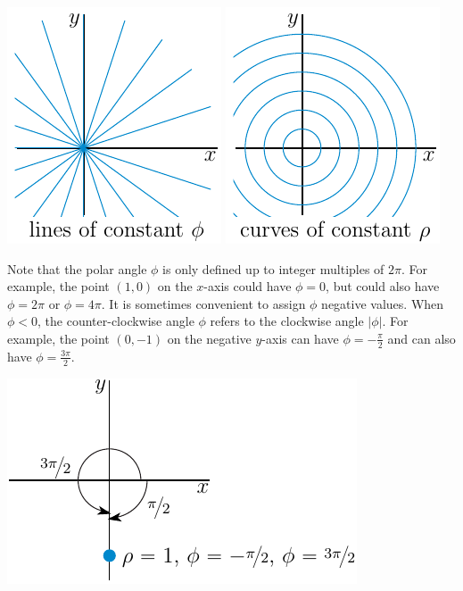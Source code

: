 \begin{efig}
\begin{center}
    \includegraphics{polarTh.pdf}\qquad\qquad
    \includegraphics{polarR.pdf}
\end{center}
\end{efig}


Note that the polar angle $\phi$ is only defined up to integer multiples
of $2\pi$. For example, the point $(1,0)$ on the $x$-axis could have 
$\phi=0$, but could also have $\phi=2\pi$ or $\phi=4\pi$. It is sometimes
convenient to assign $\phi$ negative values. When $\phi<0$, the
counter-clockwise angle $\phi$ refers to the clockwise angle $|\phi|$. 
For example, the point $(0,-1)$ on the negative $y$-axis can have $\phi=-\frac{\pi}{2}$ and can also have $\phi=\frac{3\pi}{2}$.
\begin{efig}
\begin{center}
    \includegraphics{polarNegTh.pdf}
\end{center}
\end{efig}



